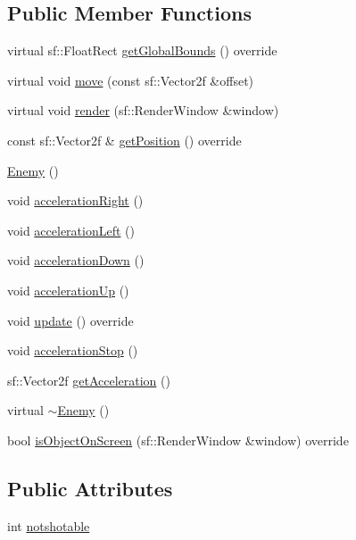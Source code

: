 \subsection*{Public Member Functions}
\begin{DoxyCompactItemize}
\item 
virtual sf\+::\+Float\+Rect \hyperlink{class_enemy_abb50439b9517d5a2b4c6b6c6a4e91672}{get\+Global\+Bounds} () override
\item 
virtual void \hyperlink{class_enemy_a4db256c45aa8d835561e035969883069}{move} (const sf\+::\+Vector2f \&offset)
\item 
virtual void \hyperlink{class_enemy_a409d7d48e2f6bb27f878691f14a79957}{render} (sf\+::\+Render\+Window \&window)
\item 
const sf\+::\+Vector2f \& \hyperlink{class_enemy_a986074549d08157336879f6b48ce632f}{get\+Position} () override
\item 
\hyperlink{class_enemy_a94f30d348b6d2840fd71675472ba38dd}{Enemy} ()
\item 
void \hyperlink{class_enemy_a85901197eedd66445f316a9316b26bb7}{acceleration\+Right} ()
\item 
void \hyperlink{class_enemy_a842ae08ff3a191b3bfd5a0f865b968be}{acceleration\+Left} ()
\item 
void \hyperlink{class_enemy_a901af192d36d757b0cfbd2c92c742ccc}{acceleration\+Down} ()
\item 
void \hyperlink{class_enemy_acb3226b1c27efc097b3817a8efde1e93}{acceleration\+Up} ()
\item 
void \hyperlink{class_enemy_aa70d742da02995011f1618acc9e303db}{update} () override
\item 
void \hyperlink{class_enemy_afdf316b90bdf73cba5848548e8ba5180}{acceleration\+Stop} ()
\item 
sf\+::\+Vector2f \hyperlink{class_enemy_a68ad097a3d7752f0cadf18d6a961f9c7}{get\+Acceleration} ()
\item 
virtual \hyperlink{class_enemy_ac0eec4755e28c02688065f9657150ac3}{$\sim$\+Enemy} ()
\item 
bool \hyperlink{class_enemy_a9a6b7416616b3d0464978d38cf7095e9}{is\+Object\+On\+Screen} (sf\+::\+Render\+Window \&window) override
\end{DoxyCompactItemize}
\subsection*{Public Attributes}
\begin{DoxyCompactItemize}
\item 
int \hyperlink{class_enemy_a330c49a49d5c017292a6ab66678f853a}{notshotable}
\end{DoxyCompactItemize}
